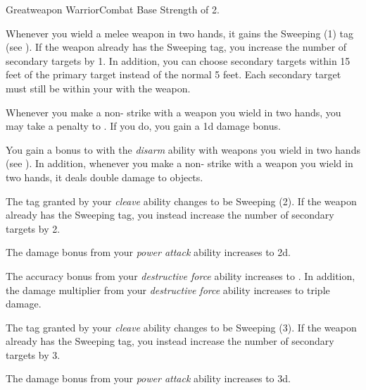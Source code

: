     \begin{feat}{Greatweapon Warrior}{Combat}
        \featpre Base Strength of 2.

         Whenever you wield a melee weapon in two hands, it gains the Sweeping (1) tag (see ).
        If the weapon already has the Sweeping tag, you increase the number of secondary targets by 1.
        In addition, you can choose secondary targets within 15 feet of the primary target instead of the normal 5 feet.
        Each secondary target must still be within your  with the weapon.

         Whenever you make a non- strike with a weapon you wield in two hands, you may take a  penalty to .
        If you do, you gain a \plus1d damage bonus.

         You gain a  bonus to  with the \textit{disarm} ability with weapons you wield in two hands (see ).
        In addition, whenever you make a non- strike with a weapon you wield in two hands, it deals double damage to objects.

         The tag granted by your \textit{cleave} ability changes to be Sweeping (2).
        If the weapon already has the Sweeping tag, you instead increase the number of secondary targets by 2.

         The damage bonus from your \textit{power attack} ability increases to \plus2d.

         The accuracy bonus from your \textit{destructive force} ability increases to .
        In addition, the damage multiplier from your \textit{destructive force} ability increases to triple damage.

         The tag granted by your \textit{cleave} ability changes to be Sweeping (3).
        If the weapon already has the Sweeping tag, you instead increase the number of secondary targets by 3.

         The damage bonus from your \textit{power attack} ability increases to \plus3d.
    \end{feat}

